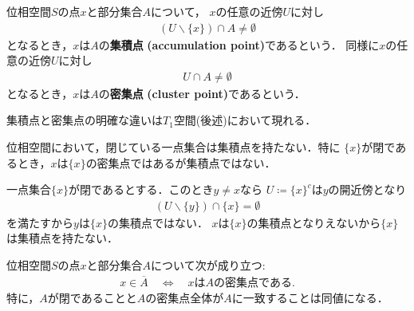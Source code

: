 	\begin{screen}
		\begin{dfn}
			位相空間$S$の点$x$と部分集合$A$について，
			$x$の任意の近傍$U$に対し
			\begin{align}
				(U \backslash \{x\}) \cap A \neq \emptyset
			\end{align}
			となるとき，$x$は$A$の{\bf 集積点}
			{\bf (accumulation point)}であるという．
			同様に$x$の任意の近傍$U$に対し
			\begin{align}
				U \cap A \neq \emptyset
			\end{align}
			となるとき，$x$は$A$の{\bf 密集点}
			{\bf (cluster point)}であるという．
		\end{dfn}
	\end{screen}
	
	集積点と密集点の明確な違いは$T_1$空間(後述)において現れる．
	\begin{screen}
		\begin{thm}[閉である一点集合は集積点を持たない]
		\label{thm:closed_singleton_has_no_accumulation_point}
			位相空間において，閉じている一点集合は集積点を持たない．特に
			$\{x\}$が閉であるとき，$x$は$\{x\}$の密集点ではあるが集積点ではない．
		\end{thm}
	\end{screen}
	
	\begin{prf}
		一点集合$\{x\}$が閉であるとする．このとき$y \neq x$なら
		$U \coloneqq \{x\}^c$は$y$の開近傍となり
		\begin{align}
			(U \backslash \{y\}) \cap \{x\} = \emptyset
		\end{align}
		を満たすから$y$は$\{x\}$の集積点ではない．
		$x$は$\{x\}$の集積点となりえないから$\{x\}$は集積点を持たない．
		\QED
	\end{prf}
	
	\begin{screen}
		\begin{thm}[閉集合は密集点集合]
		\label{thm:belongs_to_closure_iff_clusters}
			位相空間$S$の点$x$と部分集合$A$について次が成り立つ:
			\begin{align}
				x \in \overline{A} \quad \Longleftrightarrow \quad
				\mbox{$x$は$A$の密集点である}.
				\label{eq:thm_belongs_to_closure_iff_clusters}
			\end{align}
			特に，$A$が閉であることと$A$の密集点全体が$A$に一致することは同値になる．
		\end{thm}
	\end{screen}
	
